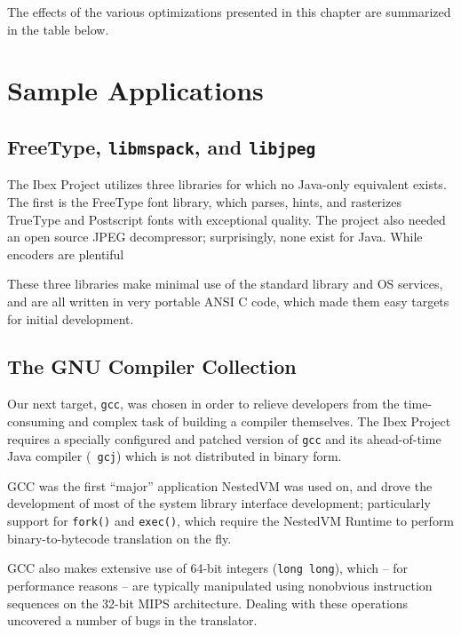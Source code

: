 \documentclass{acmconf}
\begin{document}
The effects of the various optimizations presented in this chapter are
summarized in the table below.





\section{Sample Applications}

\subsection{FreeType, {\tt libmspack}, and {\tt libjpeg}}

The Ibex Project utilizes three libraries for which no Java-only
equivalent exists.  The first is the FreeType font library, which
parses, hints, and rasterizes TrueType and Postscript fonts with
exceptional quality.  The project also needed an open source JPEG
decompressor; surprisingly, none exist for Java.  While encoders are
plentiful

These three libraries make minimal use of the standard library and OS
services, and are all written in very portable ANSI C code, which made
them easy targets for initial development.

\subsection{The GNU Compiler Collection}

Our next target, {\tt gcc}, was chosen in order to relieve developers
from the time-consuming and complex task of building a compiler
themselves.  The Ibex Project requires a specially configured and
patched version of {\tt gcc} and its ahead-of-time Java compiler ({\tt
gcj}) which is not distributed in binary form.

GCC was the first ``major'' application NestedVM was used on, and
drove the development of most of the system library interface
development; particularly support for {\tt fork()} and {\tt exec()},
which require the NestedVM Runtime to perform binary-to-bytecode
translation on the fly.

GCC also makes extensive use of 64-bit integers ({\tt long long}),
which -- for performance reasons -- are typically manipulated using
nonobvious instruction sequences on the 32-bit MIPS architecture.
Dealing with these operations uncovered a number of bugs in the
translator.
\end{document}

